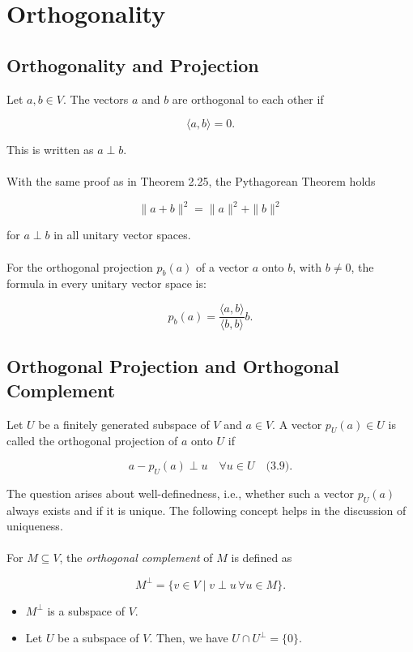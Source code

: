 \section{Orthogonality}

\subsection{Orthogonality and Projection}

Let \( a, b \in V \). The vectors \( a \) and \( b \) are orthogonal to each other if

\[
\langle a, b \rangle = 0.
\]

This is written as \( a \perp b \).
\\\\
With the same proof as in Theorem 2.25, the Pythagorean Theorem holds

\[
\|a + b\|^2 = \|a\|^2 + \|b\|^2
\]

for \( a \perp b \) in all unitary vector spaces.
\\\\
For the orthogonal projection \( p_b(a) \) of a vector \( a \) onto \( b \), with \( b \neq 0 \), the formula in every unitary vector space is:

\[
p_b(a) = \frac{\langle a, b \rangle}{\langle b, b \rangle} b.
\]

\subsection{Orthogonal Projection and Orthogonal Complement}

Let \( U \) be a finitely generated subspace of \( V \) and \( a \in V \). A vector \( p_U(a) \in U \) is called the orthogonal projection of \( a \) onto \( U \) if

\[
a - p_U(a) \perp u \quad \forall u \in U \quad \text{(3.9)}.
\]

The question arises about well-definedness, i.e., whether such a vector \( p_U(a) \) always exists and if it is unique. The following concept helps in the discussion of uniqueness.
\\\\
For \( M \subseteq V \), the \emph{orthogonal complement} of \( M \) is defined as

\[
M^\perp = \{ v \in V \mid v \perp u \, \forall u \in M \}.
\]

\begin{itemize}[label=\(-\)]
    \item \( M^\perp \) is a subspace of \( V \).
    \item Let \( U \) be a subspace of \( V \). Then, we have \( U \cap U^\perp = \{0\} \).
\end{itemize}

